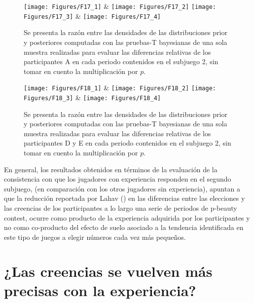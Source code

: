 \begin{figure}[hp]
\centering
\texttt{[image: Figures/F17\_1]} & \texttt{[image: Figures/F17\_2]} 
\texttt{[image: Figures/F17\_3]} & \texttt{[image: Figures/F17\_4]} 
\decoRule
\caption[Evaluación de las Diferencias Relativas entre creencias y elecciones en el Subjuego 1 sin la multiplicación por p (Factor de Bayes)]{Se presenta la razón entre las densidades de las distribuciones prior y posteriores  computadas con las pruebas-T bayesianas de una sola muestra realizadas para evaluar las diferencias relativas de los participantes A en cada periodo contenidos en el subjuego 2, sin tomar en cuento la multiplicación por $p$.}
\label{fig:DRnop_S2_A}
\end{figure}  


\begin{figure}[hp]
\centering
\texttt{[image: Figures/F18\_1]} & \texttt{[image: Figures/F18\_2]} 
\texttt{[image: Figures/F18\_3]} & \texttt{[image: Figures/F18\_4]} 
\decoRule
\caption[Evaluación de las Diferencias Relativas entre creencias y elecciones en el Subjuego 1 sin la multiplicación por p (Factor de Bayes)]{Se presenta la razón entre las densidades de las distribuciones prior y posteriores  computadas con las pruebas-T bayesianas de una sola muestra realizadas para evaluar las diferencias relativas de los participantes D y E en cada periodo contenidos en el subjuego 2, sin tomar en cuento la multiplicación por $p$.}
\label{fig:DRnop_S2_DyE}
\end{figure}  

En general, los resultados obtenidos en términos de la evaluación de la consistencia con que los jugadores con experiencia responden en el segundo subjuego, (en comparación con los otros jugadores sin experiencia), apuntan a que la reducción reportada por Lahav (\citeyear{Lahav}) en las diferencias entre las elecciones y las creencias de los participantes a lo largo una serie de periodos de p-beauty contest, ocurre como producto de la experiencia adquirida por los participantes y no como co-producto del efecto de suelo asociado a la tendencia identificada en este tipo de juegos a elegir números cada vez más pequeños.\\

\section{¿Las creencias se vuelven más precisas con la experiencia?}\\

